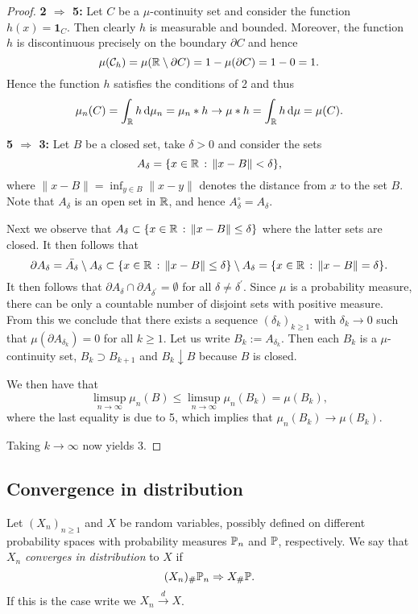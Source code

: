 \begin{proof}
\textbf{2 $\Rightarrow$ 5:} Let $C$ be a $\mu$-continuity set and consider the function $h(x) = \mathbf{1}_{C}$. Then clearly $h$ is measurable and bounded. Moreover, the function $h$ is discontinuous precisely on the boundary $\partial C$ and hence
\[
	\mu(\mathcal C_h) =\mu(\mathbb R \setminus \partial C) = 1 - \mu(\partial C) = 1-0 = 1.
\]
Hence the function $h$ satisfies the conditions of 2 and thus
\[
	\mu_n(C) = \int_{\mathbb R} h \, \mathrm{d} \mu_n = \mu_n \ast h \to \mu \ast h = \int_{\mathbb R} h \, \mathrm{d} \mu = \mu(C).
\]


\textbf{5 $\Rightarrow$ 3:} Let $B$ be a closed set, take $\delta > 0$ and consider the sets
\[
	A_\delta = \{x \in \mathbb R \, : \, \|x - B\| < \delta\},
\]
where $\|x - B\| = \inf_{y \in B} \|x - y\|$ denotes the distance from $x$ to the set $B$. Note that $A_\delta$ is an open set in $\mathbb R$, and hence $A_\delta^\circ = A_\delta$.

Next we observe that $A_\delta \subset \{x \in \mathbb R \, : \, \|x-B\| \le \delta\}$ where the latter sets are closed. It then follows that
\[
	\partial A_\delta = \bar{A_\delta} \setminus A_\delta \subset \{x \in \mathbb R \, : \, \|x-B\| \le \delta\} \setminus A_\delta = \{x \in \mathbb R \, : \, \|x-B\| = \delta\}.
\]
It then follows that $\partial A_\delta \cap \partial A_{\delta^\prime} = \emptyset$ for all $\delta \ne \delta^\prime$. Since $\mu$ is a probability measure, there can be only a countable number of disjoint sets with positive measure. From this we conclude that there exists a sequence $(\delta_k)_{k \ge 1}$ with $\delta_k \to 0$ such that $\mu(\partial A_{\delta_k}) = 0$ for all $k \ge 1$. Let us write $B_k := A_{\delta_k}$. Then each $B_k$ is a $\mu$-continuity set, $B_k \supset B_{k + 1}$ and $B_k \downarrow B$ because $B$ is closed.

We then have that
\[
	\limsup_{n \to \infty} \mu_n(B) \le \limsup_{n \to \infty} \mu_n(B_k) = \mu(B_k),
\]
where the last equality is due to 5, which implies that $\mu_n(B_k) \to \mu(B_k)$.

Taking $k \to \infty$ now yields 3.


\end{proof}

\subsection{Convergence in distribution}

\begin{definition}\label{def:convergence_distribution}
Let $(X_n)_{n \ge 1}$ and $X$ be random variables, possibly defined on different probability spaces with probability measures $\mathbb P_n$ and $\mathbb P$, respectively. We say that $X_n$ \emph{converges in distribution} to $X$ if
\[
	(X_n)_\# \mathbb P_n \Rightarrow X_\# \mathbb P.
\]
If this is the case write we $X_n \stackrel{d}{\rightarrow} X$.
\end{definition}

